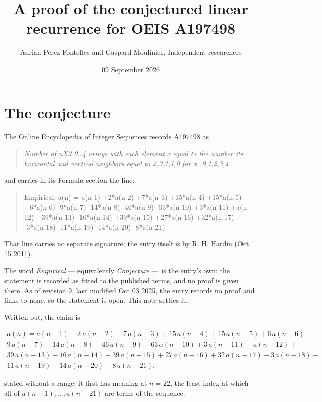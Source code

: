 \documentclass[11pt]{article}
\title{A proof of the conjectured linear recurrence for OEIS A197498}
\author{Adrian Perez Fontelles and Gaspard Moulinier, Independent researchers}
\date{09 September 2026}
\theoremstyle{definition}
\begin{document}
\maketitle
\section{The conjecture}

The Online Encyclopedia of Integer Sequences records \href{https://oeis.org/A197498}{A197498} as

\begin{quote}\itshape Number of nX3 0..4 arrays with each element x equal to the number its horizontal and vertical neighbors equal to 2,3,1,1,0 for x=0,1,2,3,4\end{quote}

and carries in its Formula section the line:

\begin{quote}\ttfamily Empirical: a(n) = a(n-1) +2*a(n-2) +7*a(n-3) +15*a(n-4) +15*a(n-5) +6*a(n-6) -9*a(n-7) -14*a(n-8) -46*a(n-9) -63*a(n-10) +3*a(n-11) +a(n-12) +39*a(n-13) -16*a(n-14) +39*a(n-15) +27*a(n-16) +32*a(n-17) -3*a(n-18) -11*a(n-19) -14*a(n-20) -8*a(n-21)\end{quote}

That line carries no separate signature; the entry itself is by R. H. Hardin (Oct 15 2011).

The word {\itshape Empirical} --- equivalently {\itshape Conjecture} --- is the entry's own: the statement is recorded as fitted to the published terms, and no proof is given there. As of revision 9, last modified Oct 03 2025, the entry records no proof and links to none, so the statement is open. This note settles it.

Written out, the claim is

\begin{multline*} a(n) = a(n-1) + 2\,a(n-2) + 7\,a(n-3) + 15\,a(n-4) + 15\,a(n-5) + 6\,a(n-6) - \\ 9\,a(n-7) - 14\,a(n-8) - 46\,a(n-9) - 63\,a(n-10) + 3\,a(n-11) + a(n-12) + \\ 39\,a(n-13) - 16\,a(n-14) + 39\,a(n-15) + 27\,a(n-16) + 32\,a(n-17) - 3\,a(n-18) - \\ 11\,a(n-19) - 14\,a(n-20) - 8\,a(n-21). \end{multline*}

stated without a range; it first has meaning at $n = 22$, the least index at which all of $a(n-1),\dots,a(n-21)$ are terms of the sequence.
\end{document}
